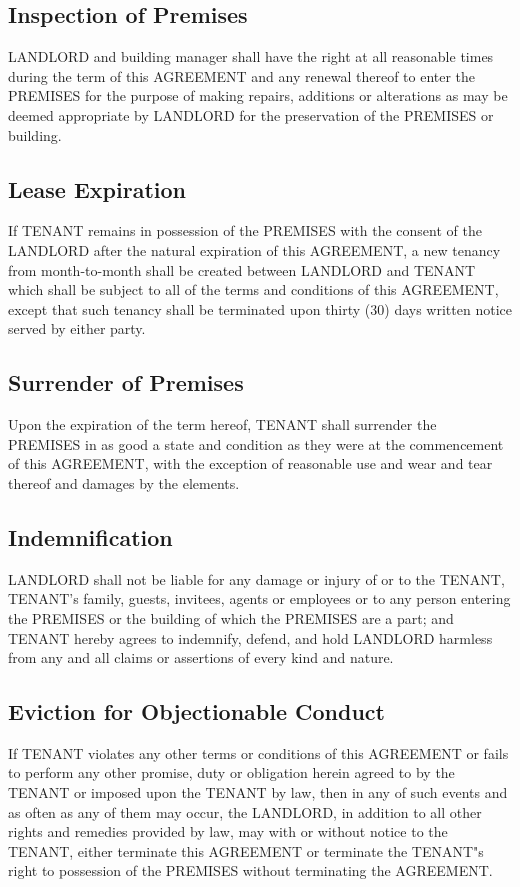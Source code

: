 \documentclass[11pt]{article}
\begin{document}
\subsection{Inspection of Premises}
\label{sec:orge0cb769}
LANDLORD and building manager shall have the right at all reasonable
times during the term of this AGREEMENT and any renewal thereof to
enter the PREMISES for the purpose of making repairs, additions or
alterations as may be deemed appropriate by LANDLORD for the
preservation of the PREMISES or building.

\subsection{Lease Expiration}
\label{sec:org09241eb}
If TENANT remains in possession of the PREMISES with the consent of
the LANDLORD after the natural expiration of this AGREEMENT, a new
tenancy from month-to-month shall be created between LANDLORD and
TENANT which shall be subject to all of the terms and conditions of
this AGREEMENT, except that such tenancy shall be terminated upon
thirty (30) days written notice served by either party.

\subsection{Surrender of Premises}
\label{sec:org0d320f2}
Upon the expiration of the term hereof, TENANT shall surrender the
PREMISES in as good a state and condition as they were at the
commencement of this AGREEMENT, with the exception of reasonable use
and wear and tear thereof and damages by the elements.

\subsection{Indemnification}
\label{sec:orge29b38d}
LANDLORD shall not be liable for any damage or injury of or to the
TENANT, TENANT's family, guests, invitees, agents or employees or to
any person entering the PREMISES or the building of which the PREMISES
are a part; and TENANT hereby agrees to indemnify, defend, and hold
LANDLORD harmless from any and all claims or assertions of every kind
and nature.

\subsection{Eviction for Objectionable Conduct}
\label{sec:org2530404}
If TENANT violates any other terms or conditions of this AGREEMENT or
fails to perform any other promise, duty or obligation herein agreed
to by the TENANT or imposed upon the TENANT by law, then in any of
such events and as often as any of them may occur, the LANDLORD, in
addition to all other rights and remedies provided by law, may with or
without notice to the TENANT, either terminate this AGREEMENT or
terminate the TENANT"s right to possession of the PREMISES without
terminating the AGREEMENT.
\end{document}

